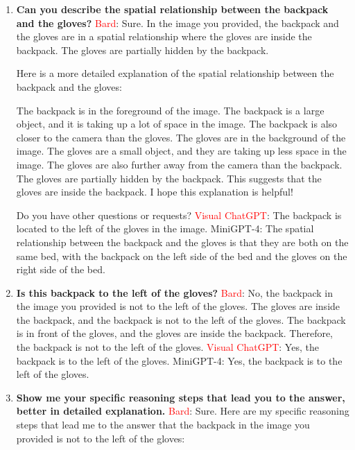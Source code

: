 \begin{enumerate}
    \item \textbf{Can you describe the spatial relationship between the backpack and the gloves?}
    \subitem \textcolor{Red}{Bard}: Sure. In the image you provided, the backpack and the gloves are in a spatial relationship where the gloves are inside the backpack. The gloves are partially hidden by the backpack.

    Here is a more detailed explanation of the spatial relationship between the backpack and the gloves:
    
    The backpack is in the foreground of the image. The backpack is a large object, and it is taking up a lot of space in the image. The backpack is also closer to the camera than the gloves.
    The gloves are in the background of the image. The gloves are a small object, and they are taking up less space in the image. The gloves are also further away from the camera than the backpack.
    The gloves are partially hidden by the backpack. This suggests that the gloves are inside the backpack.
    I hope this explanation is helpful!
    
    Do you have other questions or requests?
    \subitem \textcolor{red}{Visual ChatGPT}: The backpack is located to the left of the gloves in the image.
    \subitem MiniGPT-4: The spatial relationship between the backpack and the gloves is that they are both on the same bed, with the backpack on the left side of the bed and the gloves on the right side of the bed.
    \item \textbf{Is this backpack to the left of the gloves?}
    \subitem \textcolor{Red}{Bard}: 
    No, the backpack in the image you provided is not to the left of the gloves. The gloves are inside the backpack, and the backpack is not to the left of the gloves. The backpack is in front of the gloves, and the gloves are inside the backpack. Therefore, the backpack is not to the left of the gloves.
    \subitem \textcolor{red}{Visual ChatGPT}: Yes, the backpack is to the left of the gloves.
    \subitem MiniGPT-4: Yes, the backpack is to the left of the gloves.
    \item \textbf{Show me your specific reasoning steps that lead you to the answer, better in detailed explanation.}
    \subitem \textcolor{Red}{Bard}: 
    Sure. Here are my specific reasoning steps that lead me to the answer that the backpack in the image you provided is not to the left of the gloves:


\end{enumerate}
